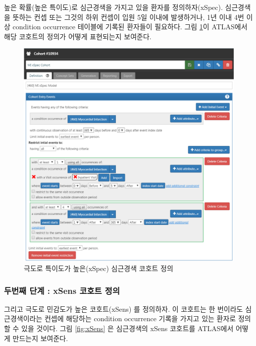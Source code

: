 \documentclass[11pt]{book}
\theoremstyle{definition}
\theoremstyle{definition}
\theoremstyle{definition}
\theoremstyle{remark}
\begin{document}
높은 확률(높은 특이도)로 심근경색을 가지고 있을 환자를 정의하자(xSpec).
심근경색을 뜻하는 컨셉 또는 그것의 하위 컨셉이 입원 5일 이내에
발생하거나, 1년 이내 4번 이상 condition occurrence 테이블에 기록된
환자들이 필요하다. 그림 \ref{fig:xSpec}이 ATLAS에서 해당 코호트의 정의가
어떻게 표현되는지 보여준다. 

\begin{figure}

{\centering \includegraphics[width=1\linewidth]{images/ClinicalValidity/xSpec} 

}

\caption{극도로 특이도가 높은(xSpec) 심근경색 코호트 정의}\label{fig:xSpec}
\end{figure}

\subsubsection*{두번째 단계 : xSens 코호트 정의}\label{--xsens--}

그리고 극도로 민감도가 높은 코호트(xSens) 를 정의하자. 이 코호트는 한
번이라도 심근경색이라는 컨셉에 해당하는 condition occurrence 기록을
가지고 있는 환자로 정의할 수 있을 것이다. 그림 \ref{fig:xSens} 은
심근경색의 xSens 코호트를 ATLAS에서 어떻게 만드는지 보여준다.
\end{document}
